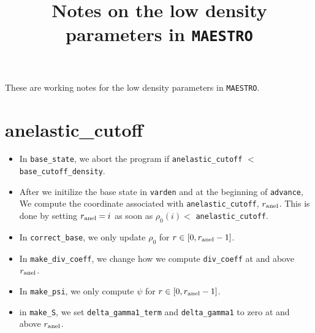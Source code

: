\documentclass[11pt]{article}
\title{Notes on the low density parameters in {\tt MAESTRO}}
\begin{document}
\maketitle
\tableofcontents

These are working notes for the low density parameters in {\tt MAESTRO}.
\section{anelastic\_cutoff}
\begin{itemize}
\item In {\tt base\_state}, we abort the program if {\tt anelastic\_cutoff} $<$ {\tt base\_cutoff\_density}.
\item After we initilize the base state in {\tt varden} and at the beginning of {\tt advance}, We compute the coordinate associated with {\tt anelastic\_cutoff}, $r_{\rm anel}$.  This is done by setting $r_{\rm anel} = i$ as soon as $\rho_0(i) <$ {\tt anelastic\_cutoff}.
\item In {\tt correct\_base}, we only update $\rho_0$ for $r\in[0,r_{\rm anel}-1]$.
\item In {\tt make\_div\_coeff}, we change how we compute {\tt div\_coeff} at and above $r_{\rm anel}$.
\item In {\tt make\_psi}, we only compute $\psi$ for $r\in[0,r_{\rm anel}-1]$.
\item in {\tt make\_S}, we set {\tt delta\_gamma1\_term} and {\tt delta\_gamma1} to zero at and above $r_{\rm anel}$.
\end{itemize}
\end{document}
